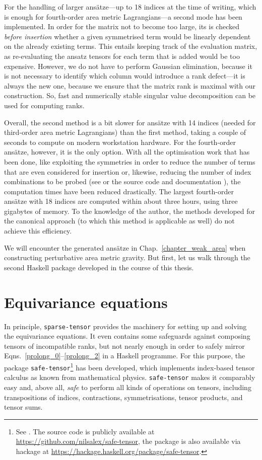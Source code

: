 For the handling of larger ansätze---up to 18 indices at the time of writing, which is enough for fourth-order area metric Lagrangians---a second mode has been implemented. In order for the matrix not to become too large, its is checked \emph{before insertion} whether a given symmetrised term would be linearly dependent on the already existing terms. This entails keeping track of the evaluation matrix, as re-evaluating the ansatz tensors for each term that is added would be too expensive. However, we do not have to perform Gaussian elimination, because it is not necessary to identify which column would introduce a rank defect---it is always the new one, because we ensure that the matrix rank is maximal with our construction. So, fast and numerically stable singular value decomposition can be used for computing ranks.

Overall, the second method is a bit slower for ansätze with 14 indices (needed for third-order area metric Lagrangians) than the first method, taking a couple of seconds to compute on modern workstation hardware. For the fourth-order ansätze, however, it is the only option. With all the optimisation work that has been done, like exploiting the symmetries in order to reduce the number of terms that are even considered for insertion or, likewise, reducing the number of index combinations to be probed (see \cite{Reinhart_2019} or the source code and documentation \cite{Reinhart_2019_sparse-tensor}), the computation times have been reduced drastically. The largest fourth-order ansätze with 18 indices are computed within about three hours, using three gigabytes of memory. To the knowledge of the author, the methods developed for the canonical approach \cite{Schneider_2017} (to which this method is applicable as well) do not achieve this efficiency.

We will encounter the generated ansätze in Chap.~\ref{chapter_weak_area} when constructing perturbative area metric gravity. But first, let us walk through the second Haskell package developed in the course of this thesis.

\section{Equivariance equations}\label{sect_safe-tensor}
In principle, \texttt{sparse-tensor} provides the machinery for setting up and solving the equivariance equations. It even contains some safeguards against composing tensors of incompatible ranks, but not nearly enough in order to safely mirror Eqns.~\eqref{prolong_0}--\eqref{prolong_2} in a Haskell programme. For this purpose, the package \texttt{safe-tensor}\footnote{See \cite{Alex_2020_safe-tensor}. The source code is publicly available at \url{https://github.com/nilsalex/safe-tensor}, the package is also available via hackage at \url{https://hackage.haskell.org/package/safe-tensor}.} has been developed, which implements index-based tensor calculus as known from mathematical physics. \texttt{safe-tensor} makes it comparably easy and, above all, \emph{safe} to perform all kinds of operations on tensors, including transpositions of indices, contractions, symmetrisations, tensor products, and tensor sums.


